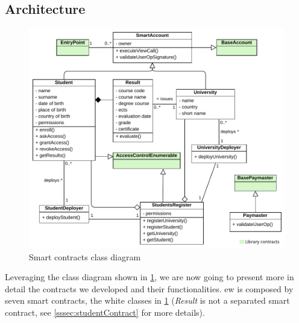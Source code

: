 \subsection{Architecture}
\begin{figure}
  \centering
  \includegraphics[width=1\textwidth]{figures/Contracts class diagram.pdf}
  \caption[Class diagram showing the smart contracts architecture.]{Smart contracts class diagram}
  \label{fig:contractsClass}
\end{figure}

Leveraging the class diagram shown in \cref{fig:contractsClass}, we are now going to present more in detail the contracts we developed and their functionalities. \acrshort{ew} is composed by seven smart contracts, the white classes in \cref{fig:contractsClass} (\textit{Result} is not a separated smart contract, see \cref{sssec:studentContract} for more details). 

